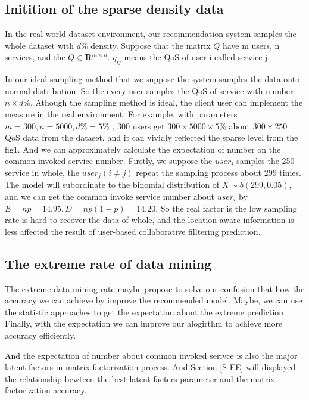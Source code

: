 \documentclass[conference]{IEEEtran}
\begin{document}
\subsection{Initition of the sparse density data}
\par In the real-world dataset environment, our recommendation system samples the whole dataset with $d \%$ density. Suppose that the matrix $Q$ have m users, n services, and the $Q\in \textbf{R}^{m\times n}$. $q_{ij}$ means the QoS of user i called service j. 
\par In our ideal sampling method that we suppose the system samples the data onto normal distribution. So the every user samples the QoS of service with number $n\times d  \% $. Athough the sampling method is ideal, the client user can implement the measure in the real environment. For example, with parameters $ m=300 , n=5000 , d\%=5\% $ , 300 users get $ 300 \times 5000 \times 5\% $ about $ 300 \times 250 $ QoS data from the dataset, and it can vividly reflected the sparse level from the fig1. And we can approximately calculate the expectation of number on the common invoked service number. Firstly, we suppose the $user_i$ samples the 250 service in whole, the $user_j (i \neq j)$ repeat the sampling process about 299 times. The model will subordinate to the binomial distribution of $X \sim b(299,0.05)$, and we can get the common invoke service number about $user_i$ by $E=np=14.95,D=np(1-p)=14.20$. So the real factor is the low sampling rate is hard to recover the data of whole, and the location-aware information is less affected the result of user-based collaborative filltering prediction.

\subsection{The extreme rate of data mining}
\par The extreme data mining rate maybe propose to solve our confusion that how the accuracy we can achieve by improve the recommended model. Maybe, we can use the statistic approaches to get the expectation about the extreme prediction. Finally, with the expectation we can improve our alogirthm to achieve more accuracy efficiently.
\par And the expectation of number about common invoked serivce is also the major latent factors in matrix factorization process. And Section \ref{S-EE} will displayed the relationship bewteen the best latent facters parameter and the matrix factorization accuracy. 
\end{document}
